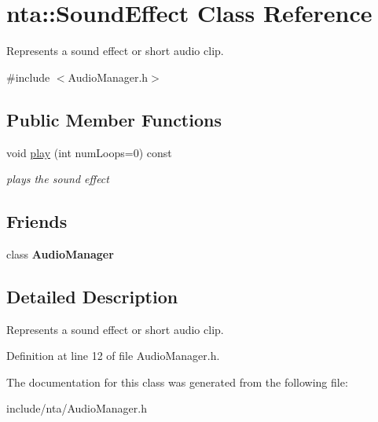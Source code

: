 \hypertarget{classnta_1_1SoundEffect}{}\section{nta\+:\+:Sound\+Effect Class Reference}
\label{classnta_1_1SoundEffect}


Represents a sound effect or short audio clip.  




{\ttfamily \#include $<$Audio\+Manager.\+h$>$}

\subsection*{Public Member Functions}
\begin{DoxyCompactItemize}
\item 
\mbox{\label{classnta_1_1SoundEffect_a2955a9f115c4e3690a9ef82eb05d498c}} 
void \hyperlink{classnta_1_1SoundEffect_a2955a9f115c4e3690a9ef82eb05d498c}{play} (int num\+Loops=0) const
\begin{DoxyCompactList}\small\item\em plays the sound effect \end{DoxyCompactList}\end{DoxyCompactItemize}
\subsection*{Friends}
\begin{DoxyCompactItemize}
\item 
\mbox{\label{classnta_1_1SoundEffect_a85edaa7e5c3ae68dabadd5373890591e}} 
class {\bfseries Audio\+Manager}
\end{DoxyCompactItemize}


\subsection{Detailed Description}
Represents a sound effect or short audio clip. 

Definition at line 12 of file Audio\+Manager.\+h.



The documentation for this class was generated from the following file\+:\begin{DoxyCompactItemize}
\item 
include/nta/Audio\+Manager.\+h\end{DoxyCompactItemize}
